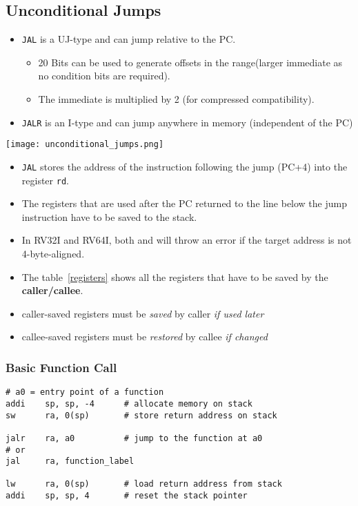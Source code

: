 \subsection{Unconditional Jumps}

\begin{itemize}
    \item \texttt{JAL} is a UJ-type and can jump relative to the PC.\
          \begin{itemize}
              \item 20 Bits can be used to generate offsets in the range\newline [-1 MB, 1 MB] (larger immediate as no condition bits are required).
              \item The immediate is multiplied by 2 (for compressed compatibility).
          \end{itemize}
    \item \texttt{JALR} is an I-type and can jump anywhere in memory (independent of the PC)
\end{itemize}

\texttt{[image: unconditional\_jumps.png]}
\begin{itemize}
    \item \texttt{JAL} stores the address of the instruction following the jump (PC+4) into the register \texttt{rd}.
    \item The registers that are used after the PC returned to the line below the jump instruction have to be saved to the stack.
    \item In RV32I and RV64I, both \code{JAL} and \code{JALR} will throw an error if the target address is not 4-byte-aligned.
    \item The table~\ref{registers} shows all the registers that have to be saved by the \textbf{caller/callee}.
    \item caller-saved registers must be \textit{saved} by caller \textit{if used later}
    \item callee-saved registers must be \textit{restored} by callee \textit{if changed}
\end{itemize}


\subsubsection{Basic Function Call}

\begin{lstlisting}[language={[RISC-V]Assembler}]
# a0 = entry point of a function 
addi    sp, sp, -4      # allocate memory on stack
sw      ra, 0(sp)       # store return address on stack

jalr    ra, a0          # jump to the function at a0
# or
jal     ra, function_label

lw      ra, 0(sp)       # load return address from stack 
addi    sp, sp, 4       # reset the stack pointer
\end{lstlisting}

